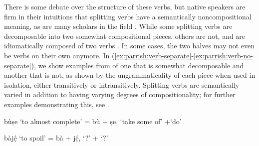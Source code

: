 \documentclass[output=paper]{LSP/langsci}
\begin{document}
There is some debate over the structure of these verbs, but native speakers are firm in their intuitions that splitting verbs have a semantically noncompositional meaning, as are many scholars in the field \citep{Bode2007,Awobuluyi1967,Awobuluyi1971,Bamgbose1966}. While some splitting verbs are decomposable into two somewhat compositional pieces, others are not, and are idiomatically composed of two verbs \citep{Awobuluyi1971}. In some cases, the two halves may not even be verbs on their own anymore. In (\ref{ex:parrish:verb-separate}-\ref{ex:parrish:verb-no-separate}), we show examples from \citet{Awobuluyi1971} of one  that is somewhat decomposable and another that is not, as shown by the ungrammaticality of each piece when used in isolation, either transitively or intransitively. Splitting verbs are semantically varied in addition to having varying degrees of compositionality; for further examples demonstrating this, see \citet{Awobuluyi1971}.

\ea b\`{u}\d{s}e `to almost complete' = b\`{u}  + \d{s}e, `take some of' +`do'
\label{ex:parrish:verb-separate}
\z 

\ea  b\`{a}j\d{\'{e}} `to spoil' = b\`{a} + j\d{\'{e}}, `?' + `?'
	

		
		\z

	
\label{ex:parrish:verb-no-separate}
\z 

\end{document}
